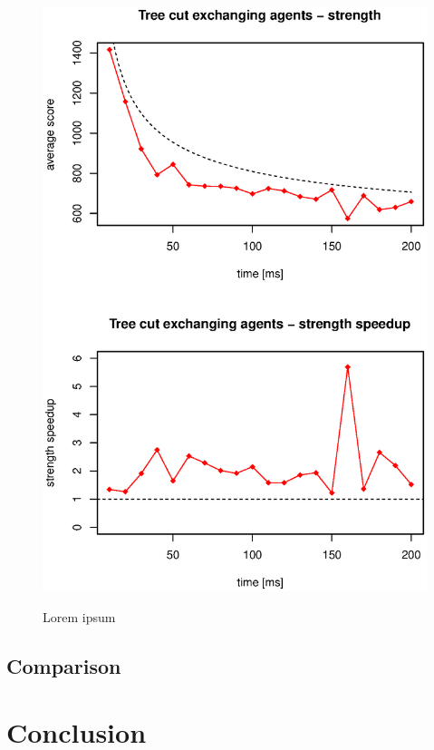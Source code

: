 \begin{figure}
\begin{center}
\includegraphics{img/tree-cut-strength.eps}
\end{center}
\caption{\footnotesize Lorem ipsum}{\footnotesize }
\label{fig_tree_cut_strength}
\end{figure}

\subsection{Comparison}

\section{Conclusion}
